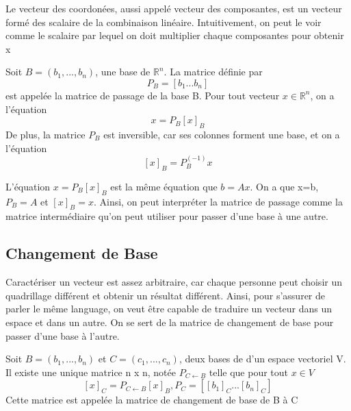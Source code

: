\documentclass{article}
\begin{document}
\begin{remark}
    Le vecteur des coordonées, aussi appelé vecteur des composantes,
    est un vecteur formé des scalaire de la combinaison linéaire.
    Intuitivement, on peut le voir comme le scalaire par lequel on
    doit multiplier chaque composantes pour obtenir x
\end{remark}

\begin{definition}
    Soit $B=(b_1, ... , b_n)$, une base de $\mathbb{R}^n$. La matrice
    définie par $$P_B = [b_1 ... b_n]$$ est appelée la matrice de passage
    de la base B. Pour tout vecteur $x \in \mathbb{R}^n$, on a
    l'équation $$ x = P_B [x]_B$$ De plus, la matrice $P_B$ est inversible,
    car ses colonnes forment une base, et on a l'équation
    $$ [x]_B = P_B ^(-1) x$$
\end{definition}

\begin{remark}
    L'équation $ x = P_B [x]_B$ est la même équation que $b=Ax$. On a que
    x=b, $P_B = A$ et $ [x]_B = x$. Ainsi, on peut interpréter la matrice
    de passage comme la matrice intermédiaire qu'on peut utiliser pour
    passer d'une base à une autre.
\end{remark}

\subsection{Changement de Base}

\begin{intuition}
    Caractériser un vecteur est assez arbitraire, car chaque personne
    peut choisir un quadrillage différent et obtenir un résultat
    différent. Ainsi, pour s'assurer de parler le même language, on
    veut être capable de traduire un vecteur dans un espace et dans un
    autre. On se sert de la matrice de changement de base pour passer
    d'une base à l'autre.
\end{intuition}

\begin{theorem}
    Soit $B=(b_1, ... , b_n)$ et $C=(c_1, ... , c_n)$, deux bases de
    d'un espace vectoriel V. Il existe une unique matrice n x n, notée
    $ P_{C \leftarrow B}$ telle que pour tout $x \in V$
    $$ [x]_C = P_{C \leftarrow B}[x]_B, P_C = [[b_1]_C ... [b_n]_C] $$
    Cette matrice est appelée la matrice de changement de base de B à C
\end{theorem}
\end{document}
